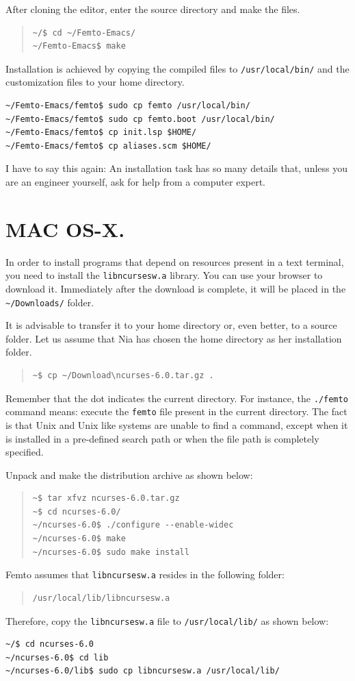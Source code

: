 \documentclass[a4paper,12pt]{book}
\begin{document}
After cloning the editor, enter the source directory
and make the files.
\begin{quote}
\begin{verbatim}
~/$ cd ~/Femto-Emacs/ 
~/Femto-Emacs$ make
\end{verbatim}
\end{quote}
Installation is achieved by copying the
compiled files to \verb|/usr/local/bin/| and
the customization files to your home directory.
\begin{verbatim}
~/Femto-Emacs/femto$ sudo cp femto /usr/local/bin/ 
~/Femto-Emacs/femto$ sudo cp femto.boot /usr/local/bin/ 
~/Femto-Emacs/femto$ cp init.lsp $HOME/ 
~/Femto-Emacs/femto$ cp aliases.scm $HOME/
\end{verbatim}

I have to say this again: An installation
task has so many details that, unless you
are an engineer yourself, 
ask for help from a computer expert.

\section{MAC OS-X.}
In order to install programs that depend
on resources present in a text terminal,
you need to install the
\verb|libncursesw.a| library. You can
use your browser to download it.
Immediately after the download is complete, it will be
placed in the \verb|~/Downloads/| folder.

It is advisable to transfer it to your
home directory or, even better, to a
source folder. Let us assume that Nia
has chosen the home directory as her
installation folder.
\begin{quote}
\begin{verbatim}
~$ cp ~/Download\ncurses-6.0.tar.gz .
\end{verbatim}
\end{quote}
Remember that the dot indicates the current
directory. For instance, the \verb|./femto|
command means: execute the \verb|femto| file
present in the current directory.
The fact is that Unix and Unix like systems
are unable to find a command, except when
it is installed in a pre-defined search
path or when the file path is completely
specified.

 Unpack and make the distribution archive as shown below:
\begin{quote}
\begin{verbatim}
~$ tar xfvz ncurses-6.0.tar.gz
~$ cd ncurses-6.0/
~/ncurses-6.0$ ./configure --enable-widec
~/ncurses-6.0$ make
~/ncurses-6.0$ sudo make install
\end{verbatim}
\end{quote}
Femto assumes that  \verb|libncursesw.a|
resides in the following folder:
\begin{quote}
\begin{verbatim}
/usr/local/lib/libncursesw.a 
\end{verbatim}
\end{quote}
Therefore, copy the \verb|libncursesw.a| file
to \verb|/usr/local/lib/| as shown below:
\begin{verbatim}
~/$ cd ncurses-6.0 
~/ncurses-6.0$ cd lib 
~/ncurses-6.0/lib$ sudo cp libncursesw.a /usr/local/lib/
\end{verbatim}
\end{document}
